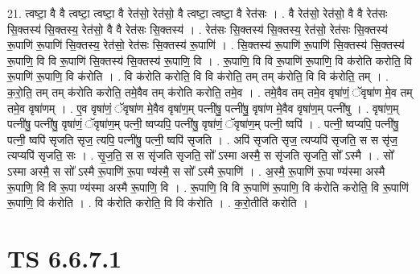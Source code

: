 \documentclass[17pt]{extarticle}
\begin{document}
21. त्वष्टा॒ वै वै त्वष्टा॒ त्वष्टा॒ वै रेत॑सो॒ रेत॑सो॒ वै त्वष्टा॒ त्वष्टा॒ वै रेत॑सः । . वै रेत॑सो॒ रेत॑सो॒ वै वै रेत॑सः सि॒क्तस्य॑ सि॒क्तस्य॒ रेत॑सो॒ वै वै रेत॑सः सि॒क्तस्य॑ । . रेत॑सः सि॒क्तस्य॑ सि॒क्तस्य॒ रेत॑सो॒ रेत॑सः सि॒क्तस्य॑ रू॒पाणि॑ रू॒पाणि॑ सि॒क्तस्य॒ रेत॑सो॒ रेत॑सः सि॒क्तस्य॑ रू॒पाणि॑ । . सि॒क्तस्य॑ रू॒पाणि॑ रू॒पाणि॑ सि॒क्तस्य॑ सि॒क्तस्य॑ रू॒पाणि॒ वि वि रू॒पाणि॑ सि॒क्तस्य॑ सि॒क्तस्य॑ रू॒पाणि॒ वि । . रू॒पाणि॒ वि वि रू॒पाणि॑ रू॒पाणि॒ वि क॑रोति करोति॒ वि रू॒पाणि॑ रू॒पाणि॒ वि क॑रोति । . वि क॑रोति करोति॒ वि वि क॑रोति॒ तम् तम् क॑रोति॒ वि वि क॑रोति॒ तम् । . क॒रो॒ति॒ तम् तम् क॑रोति करोति॒ तमे॒वैव तम् क॑रोति करोति॒ तमे॒व । . तमे॒वैव तम् तमे॒व वृषा॑णं॒ ॅवृषा॑ण मे॒व तम् तमे॒व वृषा॑णम् । . ए॒व वृषा॑णं॒ ॅवृषा॑ण मे॒वैव वृषा॑ण॒म् पत्नी॑षु॒ पत्नी॑षु॒ वृषा॑ण मे॒वैव वृषा॑ण॒म् पत्नी॑षु । . वृषा॑ण॒म् पत्नी॑षु॒ पत्नी॑षु॒ वृषा॑णं॒ ॅवृषा॑ण॒म् पत्नी॒ ष्वप्यपि॒ पत्नी॑षु॒ वृषा॑णं॒ ॅवृषा॑ण॒म् पत्नी॒ ष्वपि॑ । . पत्नी॒ ष्वप्यपि॒ पत्नी॑षु॒ पत्नी॒ ष्वपि॑ सृजति सृज॒ त्यपि॒ पत्नी॑षु॒ पत्नी॒ ष्वपि॑ सृजति । . अपि॑ सृजति सृज॒ त्यप्यपि॑ सृजति॒ स स सृ॑ज॒ त्यप्यपि॑ सृजति॒ सः । . सृ॒ज॒ति॒ स स सृ॑जति सृजति॒ सो᳚ ऽस्मा अस्मै॒ स सृ॑जति सृजति॒ सो᳚ ऽस्मै । . सो᳚ ऽस्मा अस्मै॒ स सो᳚ ऽस्मै रू॒पाणि॑ रू॒पा ण्य॑स्मै॒ स सो᳚ ऽस्मै रू॒पाणि॑ । . अ॒स्मै॒ रू॒पाणि॑ रू॒पा ण्य॑स्मा अस्मै रू॒पाणि॒ वि वि रू॒पा ण्य॑स्मा अस्मै रू॒पाणि॒ वि । . रू॒पाणि॒ वि वि रू॒पाणि॑ रू॒पाणि॒ वि क॑रोति करोति॒ वि रू॒पाणि॑ रू॒पाणि॒ वि क॑रोति । . वि क॑रोति करोति॒ वि वि क॑रोति । . क॒रो॒तीति॑ करोति । \newline
\pagebreak
{}

\section{ TS 6.6.7.1 }
\end{document}
